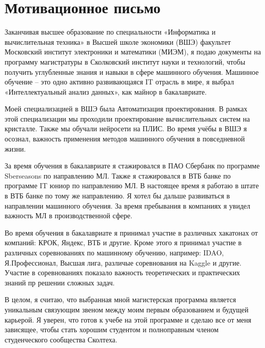 \documentclass[a4paper,14pt]{article}
\begin{document}
\section{Мотивационное письмо}
	
Заканчивая высшее образование по специальности «Информатика и вычислительная техника» в Высшей школе экономики (ВШЭ) факультет Московский институт электроники и математики (МИЭМ), я подаю документы на программу магистратуры в Сколковский институт науки и технологий, чтобы получить углубленные знания и навыки в сфере машинного обучения.
Машинное обучение – это одно активно развивающаяся IT отрасль в мире, я выбрал «Интеллектуальный анализ данных», как майнор в бакалавриате.

Моей специализацией в ВШЭ была Автоматизация проектирования.
В рамках этой специализации мы проходили проектирование вычислительных систем на кристалле.
Также мы обучали нейросети на ПЛИС. 
Во время учёбы в ВШЭ я осознал, важность применения методов машинного обучения в повседневной жизни.

За время обучения в бакалавриате я стажировался в ПАО Сбербанк по программе Sberseasons по направлению МЛ.
Также я стажировался в ВТБ банке по программе IT юниор по направлению МЛ.
В настоящее время я работаю в штате в ВТБ банке по тому же направлению.
Я хотел бы дальше развиваться в направлении машинного обучения.
За время пребывания в компаниях я увидел важность МЛ в производственной сфере.

Во время обучения в бакалавриате я принимал участие в различных хакатонах от компаний: КРОК, Яндекс, ВТБ и другие.
Кроме этого я принимал участие в различных соревнованиях по машинному обучению, например: IDAO, Я.Профессионал, Высшая лига, различые соревнования на Kaggle и другие.
Участие в соревнованиях показало важность теоретических и практических знаний пр решении сложных задач. 

В целом, я считаю, что выбранная мной магистерская программа является уникальным связующим звеном между моим первым образованием и будущей карьерой.
Я уверен, что готов к учебе на этой программе и сделаю все от меня зависящее, чтобы стать хорошим студентом и полноправным членом студенческого сообщества Сколтеха.
	
\end{document}
